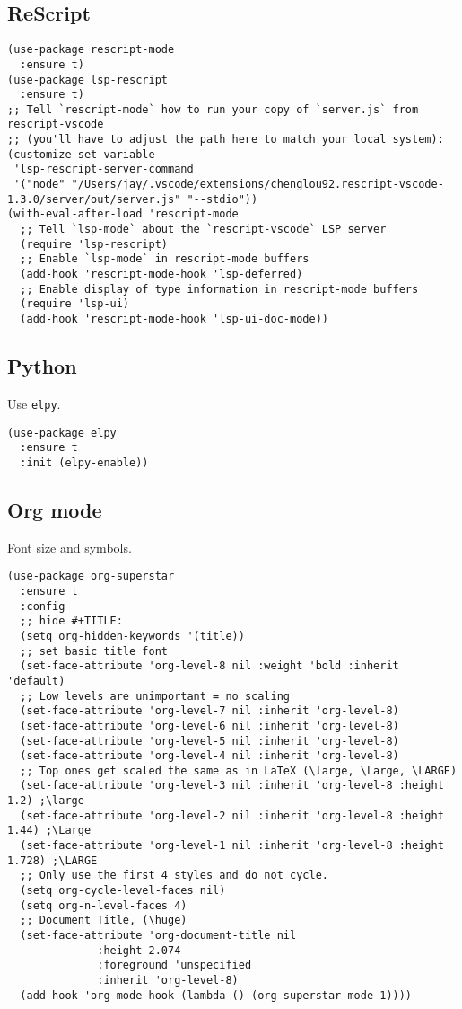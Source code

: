 \documentclass[a4paper,11pt]{article}
\begin{document}
\subsection{ReScript}
\label{sec:org9c02b89}
\begin{verbatim}
(use-package rescript-mode
  :ensure t)
(use-package lsp-rescript
  :ensure t)
;; Tell `rescript-mode` how to run your copy of `server.js` from rescript-vscode
;; (you'll have to adjust the path here to match your local system):
(customize-set-variable
 'lsp-rescript-server-command
 '("node" "/Users/jay/.vscode/extensions/chenglou92.rescript-vscode-1.3.0/server/out/server.js" "--stdio"))
(with-eval-after-load 'rescript-mode
  ;; Tell `lsp-mode` about the `rescript-vscode` LSP server
  (require 'lsp-rescript)
  ;; Enable `lsp-mode` in rescript-mode buffers
  (add-hook 'rescript-mode-hook 'lsp-deferred)
  ;; Enable display of type information in rescript-mode buffers
  (require 'lsp-ui)
  (add-hook 'rescript-mode-hook 'lsp-ui-doc-mode))
\end{verbatim}

\subsection{Python}
\label{sec:orgc47248f}
Use \texttt{elpy}.
\begin{verbatim}
(use-package elpy
  :ensure t
  :init (elpy-enable))
\end{verbatim}

\subsection{Org mode}
\label{sec:orgbc3a900}
Font size and symbols.
\begin{verbatim}
(use-package org-superstar
  :ensure t
  :config
  ;; hide #+TITLE:
  (setq org-hidden-keywords '(title))
  ;; set basic title font
  (set-face-attribute 'org-level-8 nil :weight 'bold :inherit 'default)
  ;; Low levels are unimportant = no scaling
  (set-face-attribute 'org-level-7 nil :inherit 'org-level-8)
  (set-face-attribute 'org-level-6 nil :inherit 'org-level-8)
  (set-face-attribute 'org-level-5 nil :inherit 'org-level-8)
  (set-face-attribute 'org-level-4 nil :inherit 'org-level-8)
  ;; Top ones get scaled the same as in LaTeX (\large, \Large, \LARGE)
  (set-face-attribute 'org-level-3 nil :inherit 'org-level-8 :height 1.2) ;\large
  (set-face-attribute 'org-level-2 nil :inherit 'org-level-8 :height 1.44) ;\Large
  (set-face-attribute 'org-level-1 nil :inherit 'org-level-8 :height 1.728) ;\LARGE
  ;; Only use the first 4 styles and do not cycle.
  (setq org-cycle-level-faces nil)
  (setq org-n-level-faces 4)
  ;; Document Title, (\huge)
  (set-face-attribute 'org-document-title nil
		      :height 2.074
		      :foreground 'unspecified
		      :inherit 'org-level-8)
  (add-hook 'org-mode-hook (lambda () (org-superstar-mode 1))))
\end{verbatim}
\end{document}
